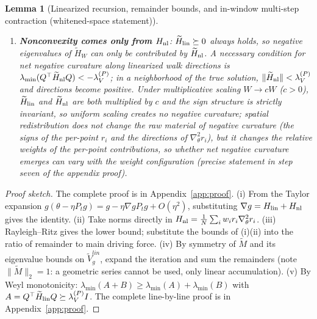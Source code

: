 \documentclass[11pt]{article}
\newcommand{\W}{W}
\newcommand{\wt}[1]{\widetilde{#1}}
\newtheorem{lemma}{Lemma}[section]
\numberwithin{equation}{section}
\begin{document}
\begin{lemma}[Linearized recursion, remainder bounds, and in-window multi-step contraction (whitened-space statement)]
\begin{enumerate}[label=(\roman*),leftmargin=2.4em,itemsep=3pt]
\begin{enumerate}[label=(\alph*),leftmargin=2em,itemsep=1pt]
  \item \emph{Long-term non-expansive upper bound}: when the window length exceeds the range controllable by $\delta_P$ (e.g., sustained Adam training, where $\delta_P=O(T)$ does not vanish as $\eta\to0$), $\bar\rho\to1$ and the bound degenerates to $\|\wt g_{k+n}\|\le C\|\wt g_k\|+n\bar\varepsilon_{\rm rem}$ ($C=\exp(O(\|P_k^{1/2}\|\delta_P))$ a constant). Here we assert only that the gradient norm does not grow exponentially; the remainder $n\bar\varepsilon_{\rm rem}$ accumulates linearly and is unbounded in $n$, and ``convergence to a bounded plateau'' would require additional lower-boundedness of the loss and first-order structural conditions.
  \end{enumerate}
  The remainder remains $O(\eta)$ (the constant contains the preconditioner drift term $C_{\rm drift}$, which explicitly carries the factor $\|P_k^{1/2}\|$; see Assumption~(P));
\item \textbf{Nonconvexity comes only from $H_{\rm nl}$}: $\wt H_{\rm lin}\succeq0$ always holds, so negative eigenvalues of $\wt H_{\W}$ can only be contributed by $\wt H_{\rm nl}$. A necessary condition for net negative curvature along linearized walk directions is $\lambda_{\min}(Q^\top\wt H_{\rm nl}Q)<-\lambda_V^{(P)}$; in a neighborhood of the true solution, $\|\wt H_{\rm nl}\|<\lambda_V^{(P)}$ and directions become positive. Under multiplicative scaling $\W\to c\W$ ($c>0$), $\wt H_{\rm lin}$ and $\wt H_{\rm nl}$ are both multiplied by $c$ and the sign structure is strictly invariant, so uniform scaling creates no negative curvature; spatial redistribution does not change the \emph{raw material} of negative curvature (the signs of the per-point $r_i$ and the directions of $\nabla_\theta^2r_i$), but it changes the relative weights of the per-point contributions, so whether net negative curvature emerges can vary with the weight configuration (precise statement in step seven of the appendix proof).
\end{enumerate}
\end{lemma}
\begin{proof}[Proof sketch] The complete proof is in Appendix~\ref{app:proof}.
(i) From the Taylor expansion $g(\theta-\eta P_tg)=g-\eta\nabla g P_tg+O(\eta^2)$, substituting $\nabla g=H_{\rm lin}+H_{\rm nl}$ gives the identity. (ii) Take norms directly in $H_{\rm nl}=\tfrac1N\sum_iw_ir_i\nabla_\theta^2r_i$. (iii) Rayleigh--Ritz gives the lower bound; substitute the bounds of (i)(ii) into the ratio of remainder to main driving force. (iv) By symmetry of $\wt M$ and its eigenvalue bounds on $\wt V_g^{lin}$, expand the iteration and sum the remainders (note $\|\wt M\|_2=1$: a geometric series cannot be used, only linear accumulation). (v) By Weyl monotonicity: $\lambda_{\min}(A+B)\ge\lambda_{\min}(A)+\lambda_{\min}(B)$ with $A=Q^\top\wt H_{\rm lin}Q\succeq\lambda_V^{(P)}I$. The complete line-by-line proof is in Appendix~\ref{app:proof}.
\end{proof}
\end{document}
